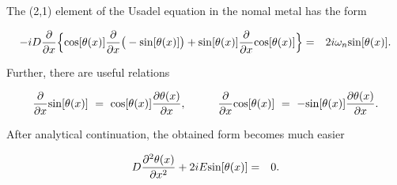\documentclass[uplatex,a4j,12pt,dvipdfmx]{jsarticle}
\begin{document}
The (2,1) element of the Usadel equation in the nomal metal has the form

\begin{eqnarray}
	-i D \dfrac{\partial}{\partial x}
	\Big\{ {\rm cos} [ \theta(x) ] \dfrac{\partial}{\partial x} \big( - {\rm sin} [ \theta(x)] \big)
	+ {\rm sin} [ \theta(x) ] \dfrac{\partial}{\partial x} {\rm cos} [ \theta(x)] \Big\}
	&=&
	2 i \omega_{n} {\rm sin} [ \theta(x) ]
	.
\end{eqnarray}

Further, there are useful relations

\begin{eqnarray}
	\dfrac{\partial}{\partial x} {\rm sin} [ \theta(x)]
	\ = \
	{\rm cos} [ \theta(x)] \dfrac{\partial \theta(x) }{\partial x}
	,
	\hspace{10mm}
	\dfrac{\partial}{\partial x} {\rm cos} [ \theta(x)]
	\ = \
	- {\rm sin} [ \theta(x)] \dfrac{\partial \theta(x) }{\partial x}
	.
\end{eqnarray}

After analytical continuation, the obtained form becomes much easier

\begin{eqnarray}
	D \dfrac{\partial^{2} \theta(x)}{\partial x^{2}}
	+
	2 i E {\rm sin} [ \theta(x) ]
	&=&
	0
	.
\end{eqnarray}
\end{document}
